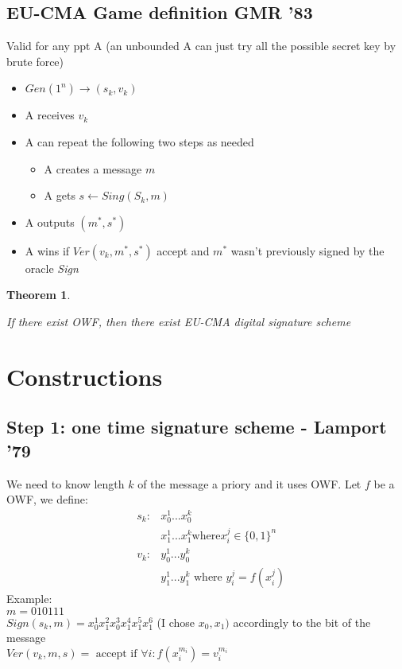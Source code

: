 \documentclass{article}
\newtheorem{thm}{Theorem}[section]
\newenvironment{theorem}{\begin{thm}\begin{rm}}%
{\end{rm}\end{thm}}
\begin{document}
\subsection{EU-CMA Game definition GMR '83}
Valid for any ppt A (an unbounded A can just try all the possible secret key by brute force)
\begin{itemize}
\item $Gen(1^n) \rightarrow (s_k,v_k)$
\item A receives $v_k$
\item A can repeat the following two steps as needed
\begin{itemize}
\item A creates a message $m$
\item A gets $s \leftarrow Sing(S_k, m)$
\end{itemize}
\item A outputs $(m^*,s^*)$
\item A wins if $Ver(v_k,m^*,s^*)$ accept and $m^*$ wasn't previously signed by the oracle \textit{Sign}
\end{itemize}

\begin{theorem}
If there exist OWF, then there exist EU-CMA digital signature scheme
\end{theorem}

\section{Constructions}
\subsection{Step 1: one time signature scheme - Lamport '79}
We need to know length $k$ of the message a priory and it uses OWF.
Let $f$ be a OWF, we define:
\begin{eqnarray}
& s_k: & x_0^1...x_0^k \\\nonumber
& &  x_1^1...x_1^k \text{where} x_i^j \in \{0,1\}^n\\\nonumber
& v_k: & y_0^1...y_0^k \\\nonumber
& &  y_1^1...y_1^k \text{ where } y_i^j = f(x_i^j)
\end{eqnarray}
Example: \\
$m = 010111$\\
$Sign(s_k,m) = x_0^1 x_1^2 x_0^3 x_1^4 x_1^5 x_1^6$ (I chose $x_0,x_1)$ accordingly to the bit of the message\\
$Ver(v_k,m,s) = \text{ accept if } \forall i: f(x_i^{m_i}) = v_i^{m_i}$
\end{document}
